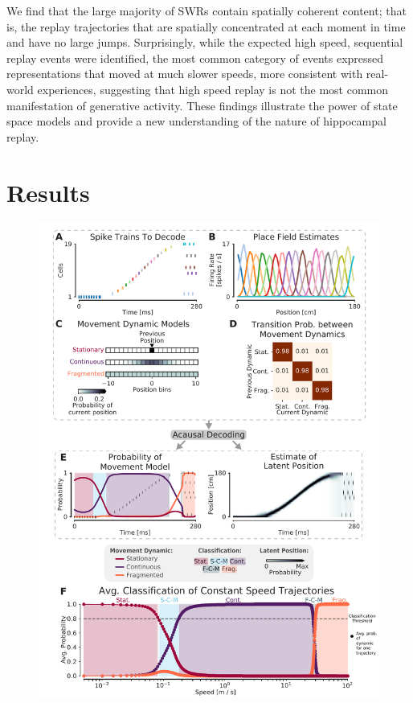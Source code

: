 \documentclass[times, twoside]{zHenriquesLab-StyleBioRxiv}
\begin{document}
We find that the large majority of SWRs contain spatially coherent content; that is, the replay trajectories that are spatially concentrated at each moment in time and have no large jumps. Surprisingly, while the expected high speed, sequential replay events were identified, the most common category of events expressed representations that moved at much slower speeds, more consistent with real-world experiences, suggesting that high speed replay is not the most common manifestation of generative activity. These findings illustrate the power of state space models and provide a new understanding of the nature of hippocampal replay.

\section*{Results}
\begin{figure}%
\centering
\includegraphics[width=0.80\linewidth]{figures/Figure1/Figure1_v6}

\end{figure}
\end{document}
